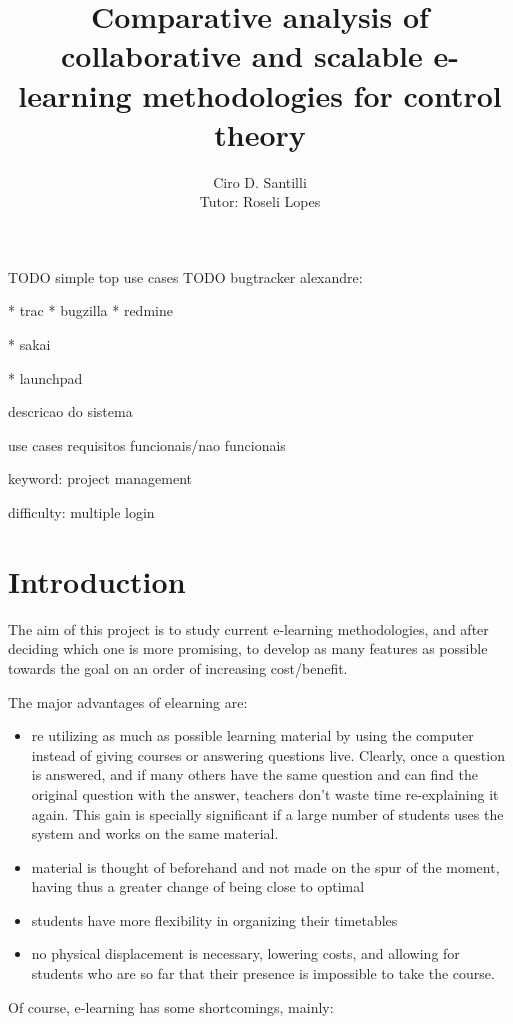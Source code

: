 \documentclass[12pt]{article}
\title{Comparative analysis of collaborative and scalable e-learning methodologies for control theory}
\author{Ciro D. Santilli\\
Tutor: Roseli Lopes
}
\begin{document}
TODO simple top use cases
TODO bugtracker alexandre:

* trac
* bugzilla
* redmine

* sakai

* launchpad

descricao do sistema

use cases
requisitos funcionais/nao funcionais


keyword: project management

difficulty: multiple login

\maketitle

\newpage

\tableofcontents

\newpage

\section{Introduction}

The aim of this project is to study current e-learning methodologies, and after deciding which one is more promising, to develop as many features as possible towards the goal on an order of increasing cost/benefit.

The major advantages of elearning are:

\begin{itemize}
  \item re utilizing as much as possible learning material by using the computer instead of giving courses or answering questions live. Clearly, once a question is answered, and if many others have the same question and can find the original question with the answer, teachers don't waste time re-explaining it again. This gain is specially significant if a large number of students uses the system and works on the same material.
  \item material is thought of beforehand and not made on the spur of the moment, having thus a greater change of being close to optimal
  \item students have more flexibility in organizing their timetables
  \item no physical displacement is necessary, lowering costs, and allowing for students who are so far that their presence is impossible to take the course.
\end{itemize}

Of course, e-learning has some shortcomings, mainly:
\end{document}
